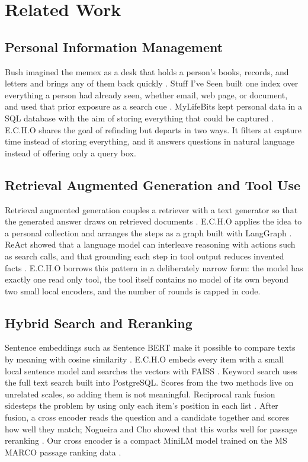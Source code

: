 \documentclass[conference]{IEEEtran}
\begin{document}
\section{Related Work}\label{sec:related}
\subsection{Personal Information Management}
Bush imagined the memex as a desk that holds a person's books, records, and letters and brings any of them back quickly \cite{b1}. Stuff I've Seen built one index over everything a person had already seen, whether email, web page, or document, and used that prior exposure as a search cue \cite{b2}. MyLifeBits kept personal data in a SQL database with the aim of storing everything that could be captured \cite{b3}. E.C.H.O shares the goal of refinding but departs in two ways. It filters at capture time instead of storing everything, and it answers questions in natural language instead of offering only a query box.

\subsection{Retrieval Augmented Generation and Tool Use}
Retrieval augmented generation couples a retriever with a text generator so that the generated answer draws on retrieved documents \cite{b4}. E.C.H.O applies the idea to a personal collection and arranges the steps as a graph built with LangGraph \cite{b5}. ReAct showed that a language model can interleave reasoning with actions such as search calls, and that grounding each step in tool output reduces invented facts \cite{b13}. E.C.H.O borrows this pattern in a deliberately narrow form: the model has exactly one read only tool, the tool itself contains no model of its own beyond two small local encoders, and the number of rounds is capped in code.

\subsection{Hybrid Search and Reranking}
Sentence embeddings such as Sentence BERT make it possible to compare texts by meaning with cosine similarity \cite{b6}. E.C.H.O embeds every item with a small local sentence model and searches the vectors with FAISS \cite{b8}. Keyword search uses the full text search built into PostgreSQL. Scores from the two methods live on unrelated scales, so adding them is not meaningful. Reciprocal rank fusion sidesteps the problem by using only each item's position in each list \cite{b9}. After fusion, a cross encoder reads the question and a candidate together and scores how well they match; Nogueira and Cho showed that this works well for passage reranking \cite{b10}. Our cross encoder is a compact MiniLM \cite{b7} model trained on the MS MARCO passage ranking data \cite{b11}.
\end{document}
